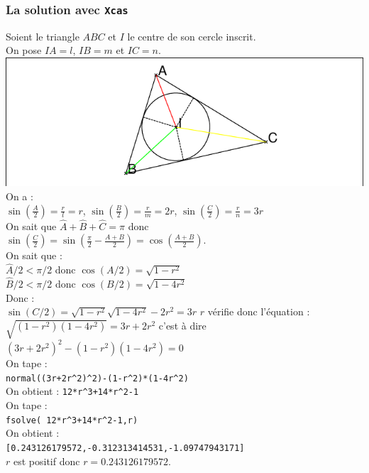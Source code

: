 \documentclass[a4paper,11pt]{book}
\begin{document}
\subsubsection{La solution avec {\tt Xcas}}
Soient le triangle $ABC$ et $I$ le centre  de son cercle inscrit.\\
On pose $IA=l$, $IB=m$ et $IC=n$.\\
\includegraphics[width=\textwidth]{baceinst4}\\
On a :\\
$\displaystyle \sin(\frac{A}{2})=\frac{r}{l}=r$, \hspace*{0.3cm}
$\displaystyle \sin(\frac{B}{2})=\frac{r}{m}=2r$, \hspace*{0.3cm}
$\displaystyle \sin(\frac{C}{2})=\frac{r}{n}=3r$\\
On sait que $\widehat A +\widehat B +\widehat C =\pi$ donc\\
$\displaystyle \sin(\frac{C}{2})=\sin(\frac{\pi}{2}-\frac{A+B}{2})=\cos(\frac{A+B}{2})$.\\
On sait que :\\
$\widehat A /2<\pi/2$ donc $\cos(A/2)=\sqrt{1-r^2}$\\
$\widehat B /2<\pi/2$ donc $\cos(B/2)=\sqrt{1-4r^2}$\\
Donc :\\
$\sin(C/2)=\sqrt{1-r^2}\sqrt{1-4r^2}-2r^2=3r$
$r$ v\'erifie donc l'\'equation :\\
$\sqrt{(1-r^2)(1-4r^2)}=3r+2r^2$ c'est \`a dire\\
$(3r+2r^2)^2-(1-r^2)(1-4r^2)=0$\\
On tape :\\
{\tt normal((3r+2r\verb|^|2)\verb|^|2)-(1-r\verb|^|2)*(1-4r\verb|^|2)}\\
On obtient :
{\tt 12*r\verb|^|3+14*r\verb|^|2-1}\\
On tape :\\
{\tt fsolve( 12*r\verb|^|3+14*r\verb|^|2-1,r)}\\
On obtient :\\
{\tt [0.243126179572,-0.312313414531,-1.09747943171]}\\
$r$ est positif donc $r=0.243126179572$.
\end{document}
